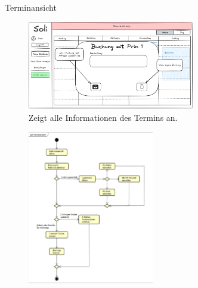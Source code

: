 \documentclass{sdqbeamer}
\begin{document}
\begin{frame}{Terminansicht}
    \begin{figure}
        \centering
        \includegraphics[width=0.65\textwidth]{pictures/figures/ui/reservierunginkalendar}
        \caption{Zeigt alle Informationen des Termins an.}
        \label{fig:terminansicht}
    \end{figure}
\end{frame}

\begin{frame}[plain]
    \begin{figure}
        \centering
        \includegraphics[width=0.49\textwidth]{pictures/figures/activity/terminansicht}
        \label{fig:terminansichtprozess}
    \end{figure}
\end{frame}
\end{document}
